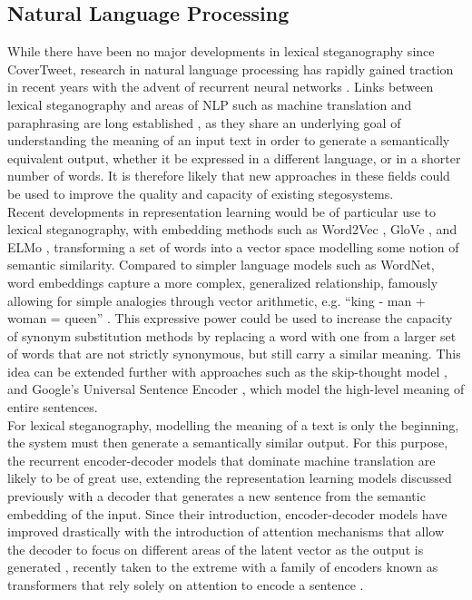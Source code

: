 \documentclass[12pt,a4paper]{article}
\begin{document}
\subsection{Natural Language Processing}

\noindent While there have been no major developments in lexical steganography since CoverTweet, research in natural language processing has rapidly gained traction in recent years with the advent of recurrent neural networks \cite{primer}. Links between lexical steganography and areas of NLP such as machine translation and paraphrasing are long established \cite{trans,syn1}, as they share an underlying goal of understanding the meaning of an input text in order to generate a semantically equivalent output, whether it be expressed in a different language, or in a shorter number of words. It is therefore likely that new approaches in these fields could be used to improve the quality and capacity of existing stegosystems.\\
\indent Recent developments in representation learning would be of particular use to lexical steganography, with embedding methods such as Word2Vec \cite{word2vec}, GloVe \cite{glove}, and ELMo \cite{elmo}, transforming a set of words into a vector space modelling some notion of semantic similarity. Compared to simpler language models such as WordNet, word embeddings capture a more complex, generalized relationship, famously allowing for simple analogies through vector arithmetic, e.g. ``king - man + woman = queen'' \cite{queen}. This expressive power could be used to increase the capacity of synonym substitution methods by replacing a word with one from a larger set of words that are not strictly synonymous, but still carry a similar meaning. This idea can be extended further with approaches such as the skip-thought model \cite{skipthought}, and Google’s Universal Sentence Encoder \cite{universal}, which model the high-level meaning of entire sentences.\\
\indent For lexical steganography, modelling the meaning of a text is only the beginning, the system must then generate a semantically similar output. For this purpose, the recurrent encoder-decoder models that dominate machine translation are likely to be of great use, extending the representation learning models discussed previously with a decoder that generates a new sentence from the semantic embedding of the input. Since their introduction, encoder-decoder models have improved drastically with the introduction of attention mechanisms that allow the decoder to focus on different areas of the latent vector as the output is generated \cite{seq2seq}, recently taken to the extreme with a family of encoders known as transformers that rely solely on attention to encode a sentence \cite{transformers}.  
\end{document}
